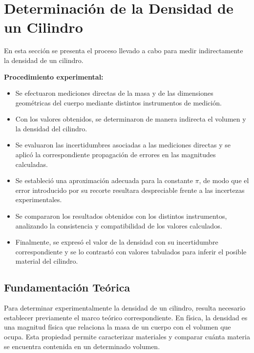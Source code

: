 \section{Determinación de la Densidad de un \-Cilindro}

En esta sección se presenta el proceso llevado a cabo para medir indirectamente la densidad de un cilindro.

\textbf{Procedimiento experimental:}
\begin{itemize}
   \item Se efectuaron mediciones directas de la masa y de las dimensiones geométricas del cuerpo mediante distintos instrumentos de medición.

   \item Con los valores obtenidos, se determinaron de manera indirecta el volumen y la densidad del cilindro.

   \item Se evaluaron las incertidumbres asociadas a las mediciones directas y se aplicó la correspondiente propagación de errores en las magnitudes calculadas.

   \item Se estableció una aproximación adecuada para la constante $\pi$, de modo que el error introducido por su recorte resultara despreciable frente a las incertezas experimentales.

   \item Se compararon los resultados obtenidos con los distintos instrumentos, analizando la consistencia y compatibilidad de los valores calculados.

   \item Finalmente, se expresó el valor de la densidad con su incertidumbre correspondiente y se lo contrastó con valores tabulados para inferir el posible material del cilindro.
\end{itemize}

\pagebreak

\subsection{Fundamentación Teórica}

Para determinar experimentalmente la densidad de un cilindro, resulta necesario establecer previamente el marco teórico correspondiente. En física, la densidad es una magnitud física que relaciona la masa de un cuerpo con el volumen que
ocupa. Esta propiedad permite caracterizar materiales y comparar cuánta materia se encuentra contenida en un determinado volumen.

